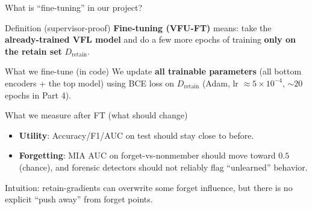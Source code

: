 \documentclass[aspectratio=169, 11pt]{beamer}
\begin{document}
\begin{frame}{What is ``fine-tuning'' in our project?}
  \begin{block}{Definition (supervisor-proof)}
    \textbf{Fine-tuning (VFU-FT)} means: take the \textbf{already-trained VFL model} and do a few more epochs of training
    \textbf{only on the retain set} \(D_{\text{retain}}\).
  \end{block}
  \vspace{0.6em}
  \begin{exampleblock}{What we fine-tune (in code)}
    We update \textbf{all trainable parameters} (all bottom encoders + the top model) using BCE loss on \(D_{\text{retain}}\)
    (Adam, lr \(\approx 5\times 10^{-4}\), \(\sim 20\) epochs in Part 4).
  \end{exampleblock}
  \vspace{0.4em}
  \begin{alertblock}{What we measure after FT (what should change)}
    \small
    \begin{itemize}
      \item \textbf{Utility}: Accuracy/F1/AUC on test should stay close to before.
      \item \textbf{Forgetting}: MIA AUC on forget-vs-nonmember should move toward \(0.5\) (chance), and forensic detectors should not reliably flag ``unlearned'' behavior.
    \end{itemize}
  \end{alertblock}
  \small Intuition: retain-gradients can overwrite some forget influence, but there is no explicit ``push away'' from forget points.
\end{frame}
\end{document}
